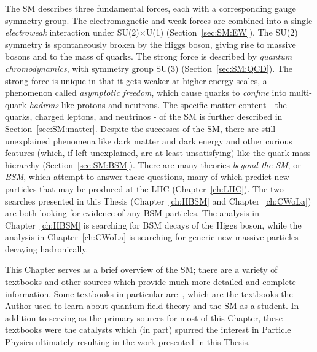 The SM describes three fundamental forces, each with a corresponding gauge symmetry group.
The electromagnetic and weak forces are combined into a single \textit{electroweak} interaction under SU(2)$\times$U(1) (Section~\ref{sec:SM:EW}). 
The SU(2) symmetry is spontaneously broken by the Higgs boson, giving rise to massive bosons and to the mass of quarks.
The strong force is described by \textit{quantum chromodynamics}, with symmetry group SU(3) (Section~\ref{sec:SM:QCD}).
The strong force is unique in that it gets weaker at higher energy scales, a phenomenon called \textit{asymptotic freedom}, which cause quarks to \textit{confine} into multi-quark \textit{hadrons} like protons and neutrons.
The specific matter content - the quarks, charged leptons, and neutrinos - of the SM is further described in Section~\ref{sec:SM:matter}.
Despite the successes of the SM, there are still unexplained phenomena like dark matter and dark energy and other curious features (which, if left unexplained, are at least unsatisfying) like the quark mass hierarchy (Section~\ref{sec:SM:BSM}).
There are many theories \textit{beyond the SM}, or \textit{BSM}, which attempt to answer these questions, many of which predict new particles that may be produced at the LHC (Chapter~\ref{ch:LHC}).
The two searches presented in this Thesis (Chapter~\ref{ch:HBSM} and Chapter~\ref{ch:CWoLa}) are both looking for evidence of any BSM particles.
The analysis in Chapter~\ref{ch:HBSM} is searching for BSM decays of the Higgs boson, while the analysis in Chapter~\ref{ch:CWoLa} is searching for generic new massive particles decaying hadronically.

This Chapter serves as a brief overview of the SM; there are a variety of textbooks and other sources which provide much more detailed and complete information.
Some textbooks in particular are~\cite{Schwartz:2013pla,Peskin:1995ev,Weinberg:1995mt,griffiths_particles}, which are the textbooks the Author used to learn about quantum field theory and the SM as a student.
In addition to serving as the primary sources for most of this Chapter, these textbooks were the catalysts which (in part) spurred the interest in Particle Physics ultimately resulting in the work presented in this Thesis.

